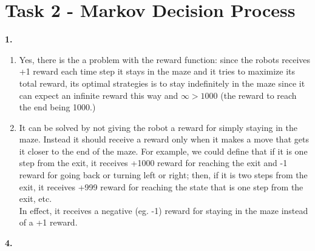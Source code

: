 \documentclass[11pt]{article}
\begin{document}
\section{Task 2 - Markov Decision Process}
\textbf{1.}
\begin{enumerate}[label=\alph*)]
	\item Yes, there is the a problem with the reward function: since the robots receives +1 reward each time step it stays in
	the maze and it tries to maximize its total reward, its optimal strategies is to stay indefinitely in the maze since it can expect
	an infinite reward this way and $\infty > 1000$ (the reward to reach the end being 1000.)
	\item It can be solved by not giving the robot a reward for simply staying in the maze. Instead it should receive a reward
	only when it makes a move that gets it closer to the end of the maze. For example, we could define that if it is one step
	from the exit, it receives +1000 reward for reaching the exit and -1 reward for going back or turning left or right; 
	then, if it is two steps from the exit, it receives +999 reward for reaching the state that is one step from the exit, etc. \\
	In effect, it receives a negative (eg. -1) reward for staying in the maze instead of a +1 reward.
\end{enumerate}
\pagebreak
\textbf{4.}
\end{document}
